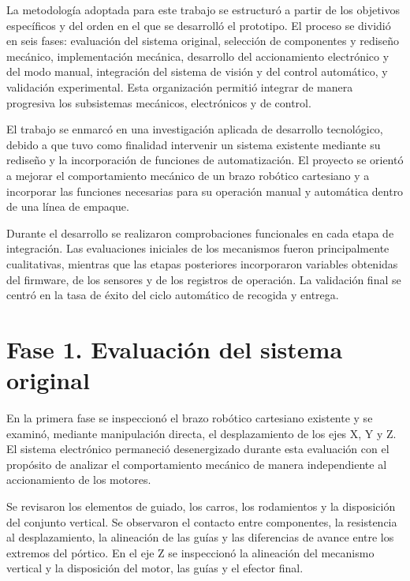 La metodología adoptada para este trabajo se estructuró a partir de los objetivos específicos y del orden en el que se desarrolló el prototipo. El proceso se dividió en seis fases: evaluación del sistema original, selección de componentes y rediseño mecánico, implementación mecánica, desarrollo del accionamiento electrónico y del modo manual, integración del sistema de visión y del control automático, y validación experimental. Esta organización permitió integrar de manera progresiva los subsistemas mecánicos, electrónicos y de control.

El trabajo se enmarcó en una investigación aplicada de desarrollo tecnológico, debido a que tuvo como finalidad intervenir un sistema existente mediante su rediseño y la incorporación de funciones de automatización. El proyecto se orientó a mejorar el comportamiento mecánico de un brazo robótico cartesiano y a incorporar las funciones necesarias para su operación manual y automática dentro de una línea de empaque.

Durante el desarrollo se realizaron comprobaciones funcionales en cada etapa de integración. Las evaluaciones iniciales de los mecanismos fueron principalmente cualitativas, mientras que las etapas posteriores incorporaron variables obtenidas del firmware, de los sensores y de los registros de operación. La validación final se centró en la tasa de éxito del ciclo automático de recogida y entrega.



\section{Fase 1. Evaluación del sistema original}

En la primera fase se inspeccionó el brazo robótico cartesiano existente y se examinó, mediante manipulación directa, el desplazamiento de los ejes X, Y y Z. El sistema electrónico permaneció desenergizado durante esta evaluación con el propósito de analizar el comportamiento mecánico de manera independiente al accionamiento de los motores.

Se revisaron los elementos de guiado, los carros, los rodamientos y la disposición del conjunto vertical. Se observaron el contacto entre componentes, la resistencia al desplazamiento, la alineación de las guías y las diferencias de avance entre los extremos del pórtico. En el eje Z se inspeccionó la alineación del mecanismo vertical y la disposición del motor, las guías y el efector final.

